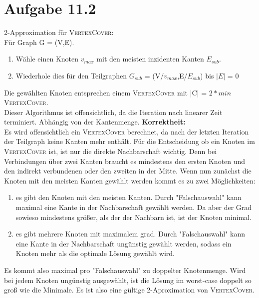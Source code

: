 \documentclass{article}
\begin{document}
\section{Aufgabe 11.2}
2-Approximation für \textsc{VertexCover}:\\
Für Graph G = (V,E).
\begin{enumerate}
	\item Wähle einen Knoten $v_{max}$ mit den meisten inzidenten Kanten $E_{sub}$.
	\item Wiederhole dies für den Teilgraphen $G_{sub}$ = (V/$v_{max}$,E/$E_{sub}$) bis $|E|$ = 0
\end{enumerate}
Die gewählten Knoten entsprechen einem \textsc{VertexCover} mit |C| = $2*min$\textsc{VertexCover}. \\
Dieser Algorithmus ist offensichtlich, da die Iteration nach linearer Zeit terminiert. Abhängig von der Kantenmenge.
\textbf{Korrektheit:}\\
Es wird offensichtlich ein \textsc{VertexCover} berechnet, da nach der letzten Iteration der Teilgraph keine Kanten mehr enthält.
Für die Entscheidung ob ein Knoten im \textsc{VertexCover} ist, ist nur die direkte Nachbarschaft wichtig. Denn bei Verbindungen über zwei Kanten braucht es mindestens den ersten Knoten und den indirekt verbundenen oder den zweiten in der Mitte. Wenn nun zunächst die Knoten mit den meisten Kanten gewählt werden kommt es zu zwei Möglichkeiten:
\begin{enumerate}
	\item es gibt den Knoten mit den meisten Kanten. Durch "Falschauswahl" kann maximal eine Kante in der Nachbarschaft gewählt werden. Da aber der Grad sowieso mindestens größer, als der der Nachbarn ist, ist der Knoten minimal.
	\item es gibt mehrere Knoten mit maximalem grad. Durch "Falschauswahl" kann eine Kante in der Nachbarschaft ungünstig gewählt werden, sodass ein Knoten mehr als die optimale Lösung gewählt wird.
\end{enumerate}
Es kommt also maximal pro "Falschauswahl" zu doppelter Knotenmenge. Wird bei jedem Knoten ungünstig ausgewählt, ist die Lösung im worst-case doppelt so groß wie die Minimale. Es ist also eine gültige 2-Aproximation von \textsc{VertexCover}.
\end{document}
